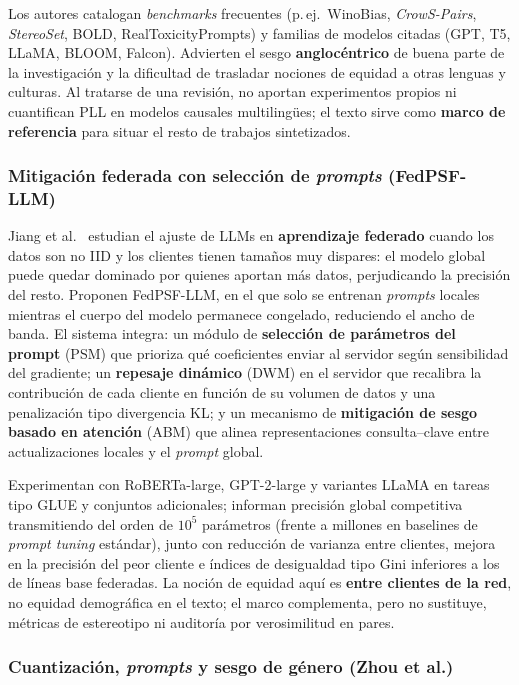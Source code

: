 \documentclass[12pt,a4paper]{report}
\begin{document}
Los autores catalogan \textit{benchmarks} frecuentes (p.\,ej.\ WinoBias, \textit{CrowS-Pairs}, \textit{StereoSet}, BOLD, RealToxicityPrompts) y familias de modelos citadas (GPT, T5, LLaMA, BLOOM, Falcon). Advierten el sesgo \textbf{anglocéntrico} de buena parte de la investigación y la dificultad de trasladar nociones de equidad a otras lenguas y culturas. Al tratarse de una revisión, no aportan experimentos propios ni cuantifican PLL en modelos causales multilingües; el texto sirve como \textbf{marco de referencia} para situar el resto de trabajos sintetizados.

\subsubsection{Mitigación federada con selección de \textit{prompts} (FedPSF-LLM)}

Jiang et al.\ \cite{jiang_fine-tuning_2026} estudian el ajuste de LLMs en \textbf{aprendizaje federado} cuando los datos son no IID y los clientes tienen tamaños muy dispares: el modelo global puede quedar dominado por quienes aportan más datos, perjudicando la precisión del resto. Proponen FedPSF-LLM, en el que solo se entrenan \textit{prompts} locales mientras el cuerpo del modelo permanece congelado, reduciendo el ancho de banda. El sistema integra: un módulo de \textbf{selección de parámetros del prompt} (PSM) que prioriza qué coeficientes enviar al servidor según sensibilidad del gradiente; un \textbf{repesaje dinámico} (DWM) en el servidor que recalibra la contribución de cada cliente en función de su volumen de datos y una penalización tipo divergencia KL; y un mecanismo de \textbf{mitigación de sesgo basado en atención} (ABM) que alinea representaciones consulta--clave entre actualizaciones locales y el \textit{prompt} global.

Experimentan con RoBERTa-large, GPT-2-large y variantes LLaMA en tareas tipo GLUE y conjuntos adicionales; informan precisión global competitiva transmitiendo del orden de \(10^5\) parámetros (frente a millones en baselines de \textit{prompt tuning} estándar), junto con reducción de varianza entre clientes, mejora en la precisión del peor cliente e índices de desigualdad tipo Gini inferiores a los de líneas base federadas. La noción de equidad aquí es \textbf{entre clientes de la red}, no equidad demográfica en el texto; el marco complementa, pero no sustituye, métricas de estereotipo ni auditoría por verosimilitud en pares.

\subsubsection{Cuantización, \textit{prompts} y sesgo de género (Zhou et al.)}
\end{document}

